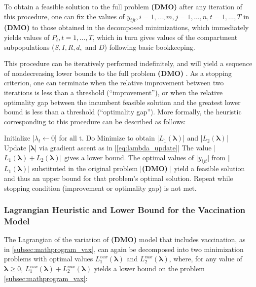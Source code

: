 \documentclass{article}
\newcommand{\model}{{\bf (DMO) }}
\begin{document}
To obtain a feasible solution to the full problem \model after any iteration of this procedure, one can fix the values of $y_{ijt}, i=1,\ldots,m,j=1,\ldots,n,t=1,\ldots,T$ in \model to those obtained in the decomposed minimizations, which immediately yields values of $P_t,t=1,\ldots,T$, which in turn gives values of the compartment subpopulations ($S,I,R,d,$ and $D$) following basic bookkeeping.

This procedure can be iteratively performed indefinitely, and will yield a sequence of nondecreasing lower bounds to the full problem \model. As a stopping criterion, one can terminate when the relative improvement between two iterations is less than a threshold (``improvement''), or when the relative optimality gap between the incumbent feasible solution and the greatest lower bound is less than a threshold (``optimality gap''). More formally, the heuristic corresponding to this procedure can be described as follows:
\begin{pseudocode}
    Initialize |$\lambda_t\leftarrow0$| for all t.
    Do
       Minimize to obtain |$L_1(\bm{\lambda})$| and |$L_2(\bm{\lambda})$|
       Update |$\bm{\lambda}$| via gradient ascent as in |\eqref{eq:lambda_update}|
       The value |$L_1(\bm{\lambda}) + L_2(\bm{\lambda})$| gives a lower bound.
       The optimal values of |$y_{ijt}$| from |$L_1(\bm{\lambda})$| substituted in the original problem |\model| yield a feasible solution and thus an upper bound for that problem's optimal solution.
    Repeat while stopping condition (improvement or optimality gap) is not met.
\end{pseudocode}


\subsubsection{Lagrangian Heuristic and Lower Bound for the Vaccination Model}

The Lagrangian of the variation of \model model that includes vaccination, as in \eqref{subsec:mathprogram_vax}, can again be decomposed into two minimization problems with optimal values $L_1^{vax}(\bm{\lambda})$ and $L_2^{vax}(\bm{\lambda})$, where, for any value of $\bm{\lambda}\ge0$, $L_1^{vax}(\bm{\lambda}) + L_2^{vax}(\bm{\lambda})$ yields a lower bound on the problem \eqref{subsec:mathprogram_vax}:
\end{document}

